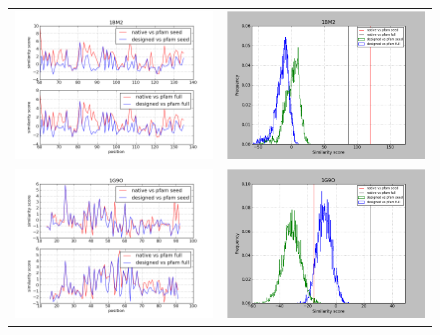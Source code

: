 \documentclass[a4paper,12pt]{article}
\begin{document}
   \begin{figure}[t]
     \centering
     \begin{tabular}{cc}
       \includegraphics[width=8.45cm]{gen_08032012/1BM2/p4/graph_simil_bypos.png} &
       \includegraphics[width=8.45cm]{gen_08032012/1BM2/p4/graph_simil_byseq.png} \\
       \includegraphics[width=8.45cm]{gen_08032012/1G9O/p4/graph_simil_bypos.png} &
       \includegraphics[width=8.45cm]{gen_08032012/1G9O/p4/graph_simil_byseq.png} \\

\end{tabular}
\end{figure}
\end{document}
